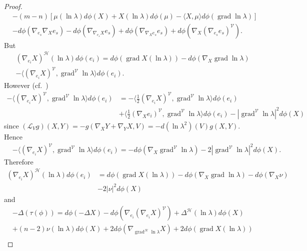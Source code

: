 \documentclass[12pt]{amsart}
\theoremstyle{plain}
\theoremstyle{definition}
\begin{document}
\begin{proof}
\begin{align*}
& - (m-n)[ \mu(\ln\lambda) d\phi(X) + X(\ln\lambda) d\phi(\mu) - \langle X, \mu \rangle d\phi(\operatorname{grad}\ln\lambda)] \\
& - d\phi(\nabla_{e_{s}}\nabla_{X} e_{s}) - d\phi(\nabla_{\nabla_{e_{s}}X}e_{s}) +
d\phi(\nabla_{\nabla_{X}e_{s}}e_{s})+ d\phi (\nabla_{X}(\nabla_{e_{s}}e_{s})^{\mathcal{V}} ).
\end{align*}
But
\begin{align*}
&(\nabla_{e_{i}}X)^{\mathcal{H}} (\ln\lambda)d\phi(e_{i}) 
= d\phi( \operatorname{grad}  X (\ln\lambda ) ) - d\phi(\nabla_{X} \operatorname{grad} \ln\lambda)\\
& - \langle (\nabla_{e_{i}}X)^{\mathcal{V}} ,  \operatorname{grad}^{\mathcal{V}} \ln\lambda \rangle d\phi(e_{i}).
\end{align*}
However (cf.~\cite[Proposition 2.5.17]{B-W})
\begin{align*}
- \langle (\nabla_{e_{i}}X)^{\mathcal{V}} ,  \operatorname{grad}^{\mathcal{V}} \ln\lambda \rangle d\phi(e_{i}) &=
 - \langle \tfrac{1}{2} (\nabla_{e_{i}}X)^{\mathcal{V}} ,  \operatorname{grad}^{\mathcal{V}} \ln\lambda \rangle d\phi(e_{i}) \\
&+ \langle \tfrac{1}{2} (\nabla_{X}e_{i})^{\mathcal{V}} ,  \operatorname{grad}^{\mathcal{V}} \ln\lambda \rangle d\phi(e_{i})
- |\operatorname{grad}^{\mathcal{V}} \ln\lambda|^2 d\phi(X)
\end{align*}
since $ ({\mathcal L}_{V} g)(X,Y) = - g( \nabla_{X}Y + \nabla_{Y}X , V) = -d(\ln\lambda^2) (V) g(X,Y)$.
Hence
\begin{align*}
&- \langle (\nabla_{e_{i}}X)^{\mathcal{V}} ,  \operatorname{grad}^{\mathcal{V}} \ln\lambda \rangle d\phi(e_{i}) = - d\phi(\nabla_{X}\operatorname{grad}^{\mathcal{V}} \ln\lambda) - 2|\operatorname{grad}^{\mathcal{V}} \ln\lambda|^2 d\phi(X).
\end{align*}
Therefore
\begin{align*}
(\nabla_{e_{i}}X)^{\mathcal{H}} (\ln\lambda)d\phi(e_{i}) &=  d\phi( \operatorname{grad}  X (\ln\lambda ) ) - d\phi(\nabla_{X} \operatorname{grad} \ln\lambda)- d\phi(\nabla_{X}\nu) \\
&- 2|\nu|^2 d\phi(X)
\end{align*}
and
\begin{align*}
&-\Delta (\tau(\phi)) =  d\phi(-\Delta X) - d\phi(\nabla_{e_{i}}(\nabla_{e_{i}}X)^{\mathcal{V}})
+ \Delta^{\mathcal{H}} (\ln\lambda) d\phi(X) \\
&+ (n-2) \nu(\ln\lambda)d\phi(X) 
 + 2 d\phi(\nabla_{\operatorname{grad}^{\mathcal{H}} \ln\lambda} X) + 2d\phi(\operatorname{grad} X(\ln\lambda)) \\

\end{align*}
\end{proof}
\end{document}
